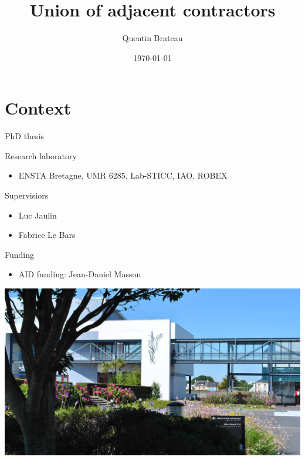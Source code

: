 \documentclass[10pt, xcolor={usenames, dvipsnames}]{beamer}
\title{Union of adjacent contractors}
\date{\today}
\author{Quentin Brateau}
\institute{ENSTA Bretagne}
\begin{document}
    \maketitle

    \section{Context}

        \begin{frame}{PhD thesis}
            \centering
            \begin{minipage}[c]{0.58\textwidth}
                \begin{block}{Research laboratory}
                    \vspace{0.2cm}
                    \begin{itemize}
                        \item ENSTA Bretagne, UMR 6285, Lab-STICC, IAO, ROBEX
                    \end{itemize}
                \end{block}

                \begin{block}{Supervisiors}
                    \begin{itemize}
                        \item Luc Jaulin
                        \item Fabrice Le Bars
                    \end{itemize}
                \end{block}

                \begin{block}{Funding}
                    \begin{itemize}
                        \item AID funding: Jean-Daniel Masson
                    \end{itemize}
                \end{block}
            \end{minipage}
            \hfill
            \begin{minipage}[c]{0.4\textwidth}
                \includegraphics[height=0.7\textheight, trim={24cm 0 16cm 0}, clip]{imgs/ensta.jpg}
            \end{minipage}
        \end{frame}
\end{document}
